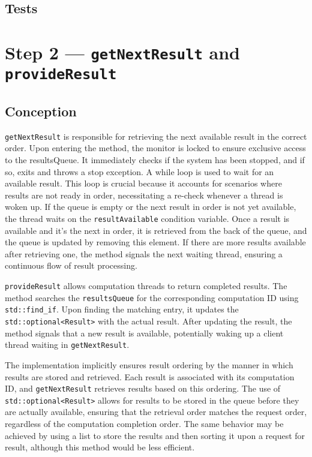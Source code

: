 \documentclass{article}
\begin{document}
    \subsection*{Tests}

    \section*{Step 2 --- \texttt{getNextResult} and \texttt{provideResult}}
    \subsection*{Conception}

    \texttt{getNextResult} is responsible for retrieving the next available result in the correct order.
    Upon entering the method, the monitor is locked to ensure exclusive access to the resultsQueue.
    It immediately checks if the system has been stopped, and if so, exits and throws a stop exception.
    A while loop is used to wait for an available result.
    This loop is crucial because it accounts for scenarios where results are not ready in order, necessitating a re-check whenever a thread is woken up.
    If the queue is empty or the next result in order is not yet available, the thread waits on the \texttt{resultAvailable} condition variable.
    Once a result is available and it's the next in order, it is retrieved from the back of the queue, and the queue is updated by removing this element.
    If there are more results available after retrieving one, the method signals the next waiting thread, ensuring a continuous flow of result processing.

    \texttt{provideResult} allows computation threads to return completed results.
    The method searches the \texttt{resultsQueue} for the corresponding computation ID using \texttt{std::find\_if}.
    Upon finding the matching entry, it updates the \texttt{std::optional<Result>} with the actual result.
    After updating the result, the method signals that a new result is available, potentially waking up a client thread waiting in \texttt{getNextResult}.

    The implementation implicitly ensures result ordering by the manner in which results are stored and retrieved.
    Each result is associated with its computation ID, and \texttt{getNextResult} retrieves results based on this ordering.
    The use of \texttt{std::optional<Result>} allows for results to be stored in the queue before they are actually available, ensuring that the retrieval order matches the request order, regardless of the computation completion order.
    The same behavior may be achieved by using a list to store the results and then sorting it upon a request for result, although this method would be less efficient.
\end{document}
